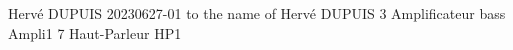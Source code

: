 \documentclass{article}
\begin{document}
\normalsize
Hervé DUPUIS
20230627-01 to the name of Hervé DUPUIS
3 Amplificateur bass Ampli1
7 Haut{-}Parleur HP1
\end{document}
